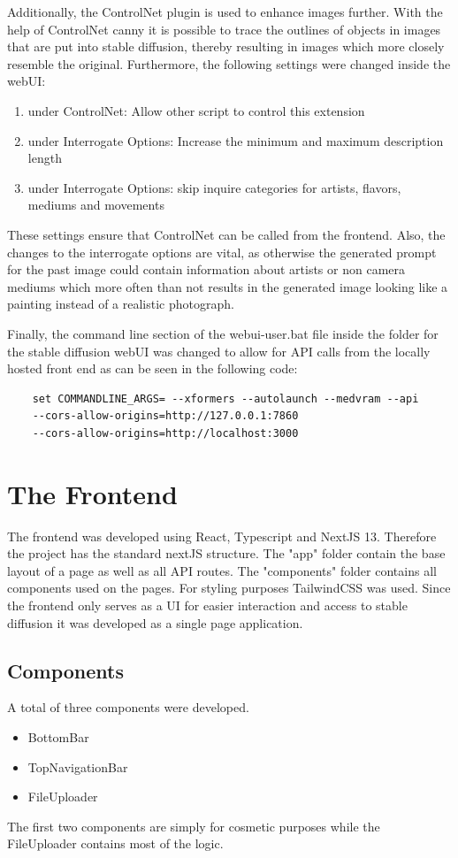 \documentclass[english,notitlepage,smartquotes]{hgbreport}
\begin{document}
Additionally, the ControlNet plugin \cite{controllNet} is used to enhance images further. With the help of ControlNet canny it is possible to trace the outlines of objects in images that are put into stable diffusion, thereby resulting in images which more closely resemble the original.
Furthermore, the following settings were changed inside the webUI:
\begin{enumerate}
    \item under ControlNet: Allow other script to control this extension
    \item under Interrogate Options: Increase the minimum and maximum description length 
    \item under Interrogate Options: skip inquire categories for artists, flavors, mediums and movements 
\end{enumerate}
These settings ensure that ControlNet can be called from the frontend. Also, the changes to the interrogate options are vital, as otherwise the generated prompt for the past image could contain information about artists or non camera mediums which more often than not results in the generated image looking like a painting instead of a realistic photograph.

Finally, the command line section of the webui-user.bat file inside the folder for the stable diffusion webUI was changed to allow for API calls from the locally hosted front end as can be seen in the following code:

\begin{verbatim}
    set COMMANDLINE_ARGS= --xformers --autolaunch --medvram --api 
    --cors-allow-origins=http://127.0.0.1:7860 
    --cors-allow-origins=http://localhost:3000
\end{verbatim}

\section{The Frontend}
The frontend was developed using React, Typescript and NextJS 13. Therefore the project has the standard nextJS structure. The "app" folder contain the base layout of a page as well as all API routes. The "components" folder contains all components used on the pages. For styling purposes TailwindCSS was used. Since the frontend only serves as a UI for easier interaction and access to stable diffusion it was developed as a single page application.

\subsection{Components}
A total of three components were developed. \begin{itemize}
    \item BottomBar 
    \item TopNavigationBar
    \item FileUploader
\end{itemize}
The first two components are simply for cosmetic purposes while the FileUploader contains most of the logic.
\end{document}
